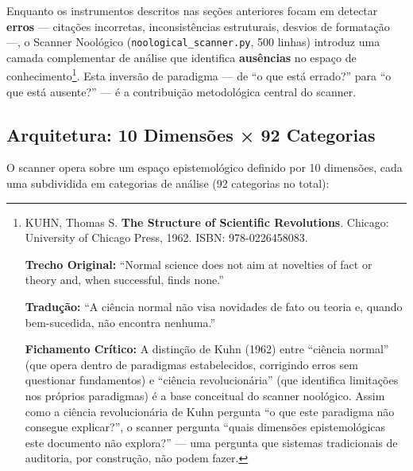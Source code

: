 Enquanto os instrumentos descritos nas seções anteriores focam em detectar \textbf{erros} --- citações incorretas, inconsistências estruturais, desvios de formatação ---, o Scanner Noológico (\texttt{noological\_scanner.py}, 500 linhas) introduz uma camada complementar de análise que identifica \textbf{ausências} no espaço de conhecimento\footnote{
  KUHN, Thomas S. \textbf{The Structure of Scientific Revolutions}. Chicago: University of Chicago Press, 1962. ISBN: 978-0226458083.

  \textbf{Trecho Original:} ``Normal science does not aim at novelties of fact or theory and, when successful, finds none.''

  \textbf{Tradução:} ``A ciência normal não visa novidades de fato ou teoria e, quando bem-sucedida, não encontra nenhuma.''

  \textbf{Fichamento Crítico:} A distinção de Kuhn (1962) entre ``ciência normal'' (que opera dentro de paradigmas estabelecidos, corrigindo erros sem questionar fundamentos) e ``ciência revolucionária'' (que identifica limitações nos próprios paradigmas) é a base conceitual do scanner noológico. Assim como a ciência revolucionária de Kuhn pergunta ``o que este paradigma não consegue explicar?'', o scanner pergunta ``quais dimensões epistemológicas este documento não explora?'' --- uma pergunta que sistemas tradicionais de auditoria, por construção, não podem fazer.
}. Esta inversão de paradigma --- de ``o que está errado?'' para ``o que está ausente?'' --- é a contribuição metodológica central do scanner.

\subsection{Arquitetura: 10 Dimensões × 92 Categorias}

O scanner opera sobre um espaço epistemológico definido por 10 dimensões, cada uma subdividida em categorias de análise (92 categorias no total):

